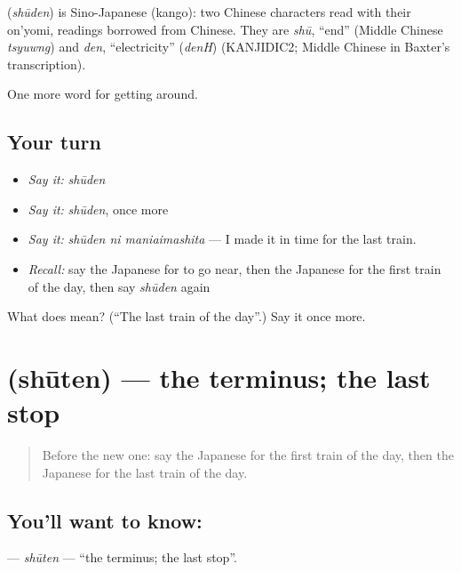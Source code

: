 \begin{cousinweb}
\textbf{} (\emph{shūden}) is Sino-Japanese (kango): two Chinese characters read with their on'yomi, readings borrowed from Chinese. They are \emph{shū}, \textquotedblleft{}end\textquotedblright{} (Middle Chinese \emph{tsyuwng}) and \emph{den}, \textquotedblleft{}electricity\textquotedblright{} (\emph{denH}) (KANJIDIC2; Middle Chinese in Baxter's transcription).
\end{cousinweb}

\begin{grammarlens}[title={What you've built}]
One more word for getting around.
\end{grammarlens}

\subsection*{Your turn}
\begin{itemize}
\raggedright
  \item \emph{Say it:} \emph{shūden}
  \item \emph{Say it:} \emph{shūden}, once more
  \item \emph{Say it:} \emph{shūden ni maniaimashita} — I made it in time for the last train.
  \item \emph{Recall:} say the Japanese for to go near, then the Japanese for the first train of the day, then say \emph{shūden} again
\end{itemize}

\begin{tcolorbox}[breakable,colback=teal!4,colframe=teal!35!black,title={Before you move on}]
What does  mean? (\textquotedblleft{}The last train of the day\textquotedblright{}.) Say it once more.
\end{tcolorbox}
\section[\texorpdfstring{\ja{しゅうてん} (shūten)}{しゅうてん (shūten)}]{ (shūten) — the terminus; the last stop}

\label{lesson:JA-C375-shuuten}



\begin{quote}
Before the new one: say the Japanese for the first train of the day, then the Japanese for the last train of the day.
\end{quote}

\subsection*{You'll want to know: }
\textbf{} — \emph{shūten} — \textquotedblleft{}the terminus; the last stop\textquotedblright{}.

